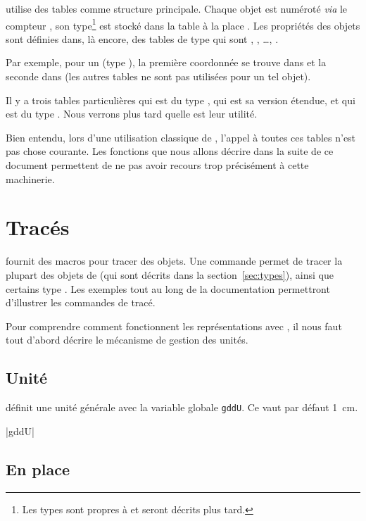 \documentclass[a4paper,french]{article}
\begin{document}
\mpgeomdd utilise des tables comme structure principale. Chaque objet est
numéroté \emph{via} le compteur , son type\footnote{Les types
sont propres à \mpgeomdd et seront décrits plus tard.} est stocké dans
la table  à la place . Les
propriétés des objets sont définies dans, là encore, des tables de
type  qui sont , ,
\dots, .

Par exemple, pour un  (type \mpgeomdd), la première coordonnée
se trouve dans  et la seconde dans 
(les autres tables ne sont pas utilisées pour un tel objet).

Il y a trois tables particulières  qui est du type
,  qui est sa version étendue, et  qui est du type
. Nous verrons plus tard quelle est leur utilité.

Bien entendu, lors d'une utilisation classique de \mpgeomdd, l'appel à
toutes ces tables n'est pas chose courante. Les fonctions que nous
allons décrire dans la suite de ce document permettent de ne pas
avoir recours trop précisément à cette machinerie.


\section{Tracés}

\mpgeomdd fournit des macros pour tracer des objets. Une commande permet de tracer
la plupart des objets de \mpgeomdd (qui sont décrits dans la
section~\ref{sec:types}), ainsi que certains type \MP. Les exemples tout au long
de la documentation permettront d'illustrer les commandes de tracé.

Pour comprendre comment fonctionnent les représentations avec \mpgeomdd, il nous faut
tout d'abord décrire le mécanisme de gestion des unités.

\subsection{Unité}

\mpgeomdd définit une unité générale avec la variable globale
\lstinline+gddU+. Ce  vaut par
défaut \SI{1}{cm}.
\begin{colourband}
  \macro|gddU|
  \end{colourband}
\subsection{En place}
\end{document}

